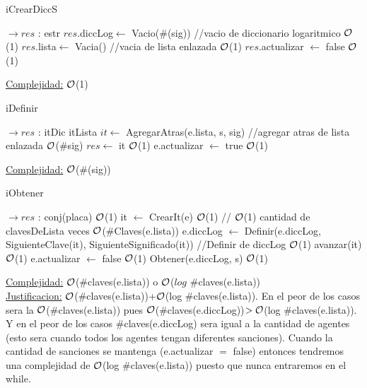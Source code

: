 \begin{Representacion}
\begin{Algoritmos}
	
	\begin{algorithm}[H]
		\caption{iCrearDiccS}
		\begin{algorithmic}[1]
			 $\to res$ : estr
			\State $res$.diccLog$\leftarrow$ Vacio($\#$(sig)) //vacio de diccionario logaritmico \Comment $\mathcal{O}$(1)
			\State $res$.lista$\leftarrow$ Vacia() //vacia de lista enlazada \Comment $\mathcal{O}$(1)
			\State $res$.actualizar $\leftarrow$ false \Comment $\mathcal{O}$(1) 
			\EndProcedure
		\end{algorithmic}
		\underline{Complejidad:} $\mathcal{O}$(1)
	\end{algorithm}
	
	\begin{algorithm}[H]
		\caption{iDefinir}
		\begin{algorithmic}[1]
			 $\to res$ : itDic
			\State itLista $it \gets$ AgregarAtras(e.lista, s, sig) //agregar atras de lista enlazada \Comment $\mathcal{O}$($\#$sig)
			\State $res \gets$ it \Comment $\mathcal{O}$(1)
			\State e.actualizar $\gets$ true \Comment $\mathcal{O}$(1) 
			\EndProcedure
		\end{algorithmic}
		\underline{Complejidad:} $\mathcal{O}$($\#$(sig))
	\end{algorithm}

	\begin{algorithm}[H]
		\caption{iObtener}
		\begin{algorithmic}[1]
			 $\to res$ : conj(placa)
			 \Comment $\mathcal{O}$(1)
				\State it $\gets$ CrearIt(e) \Comment $\mathcal{O}$(1)
				 // $\mathcal{O}$(1) cantidad de clavesDeLista veces \Comment $\mathcal{O}$($\#$Claves(e.lista))
					\State e.diccLog $\gets$ Definir(e.diccLog, SiguienteClave(it), SiguienteSignificado(it)) //Definir de diccLog \Comment $\mathcal{O}$(1) 
					\State avanzar(it) \Comment $\mathcal{O}$(1) 
				\EndWhile
				\State e.actualizar $\gets$ false \Comment $\mathcal{O}$(1) 
			\EndIf
			\State Obtener(e.diccLog, s) $\mathcal{O}$(1)
			\EndProcedure
		\end{algorithmic}
		\underline{Complejidad:} $\mathcal{O}$($\#$claves(e.lista)) o $\mathcal{O}$($log$ $\#$claves(e.lista))\\
		
		\underline{Justificacion:} $\mathcal{O}$($\#$claves(e.lista))+$\mathcal{O}$(log $\#$claves(e.lista)). En el peor de los casos sera la $\mathcal{O}$($\#$claves(e.lista)) pues $\mathcal{O}$($\#$claves(e.diccLog))$>\mathcal{O}$(log $\#$claves(e.lista)). Y en el peor de los casos $\#$claves(e.diccLog) sera igual a la cantidad de agentes (esto sera cuando todos los agentes tengan diferentes sanciones). Cuando la cantidad de sanciones se mantenga (e.actualizar $=$ false) entonces tendremos una complejidad de $\mathcal{O}$(log $\#$claves(e.lista)) puesto que nunca entraremos en el while.
	\end{algorithm}	
	

\end{Algoritmos}
\end{Representacion}
